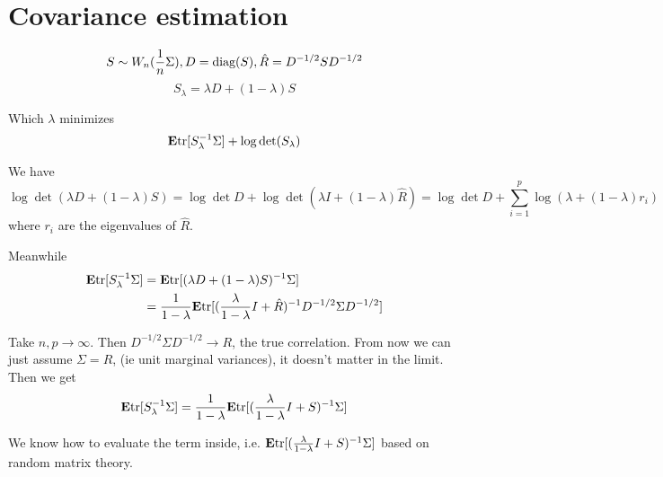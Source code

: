\documentclass[12pt]{article}
\begin{document}
\section{Covariance estimation}

\[
S \sim W_n(\frac{1}{n}\Sigma), D = \text{diag}(S), \hat{R} = D^{-1/2}S D^{-1/2}
\]
\[
S_\lambda = \lambda D + (1-\lambda)S
\]

Which $\lambda$ minimizes
\[
\textbf{E} \text{tr}[S_\lambda^{-1} \Sigma] + \log\det(S_\lambda)
\]

We have
\[
\log\det(\lambda D + (1-\lambda)S) = \log\det D + \log\det(\lambda I + (1-\lambda)\hat{R}) = \log\det D + \sum_{i=1}^p \log (\lambda + (1-\lambda) r_i)
\]
where $r_i$ are the eigenvalues of $\hat{R}$.

Meanwhile
\begin{align*}
\textbf{E} \text{tr}[S_\lambda^{-1} \Sigma] &=
\textbf{E} \text{tr}[(\lambda D + (1-\lambda)S)^{-1}\Sigma]
\\&= 
\frac{1}{1-\lambda} \textbf{E} \text{tr}[(\frac{\lambda}{1-\lambda}I +\hat{R})^{-1}D^{-1/2}\Sigma D^{-1/2}]
\end{align*}

Take $n, p \to \infty$.  Then $D^{-1/2}\Sigma D^{-1/2} \to R$, the true correlation.  From now we can just assume $\Sigma=R$, (ie unit marginal variances), it doesn't matter in the limit.  Then we get
\[
\textbf{E} \text{tr}[S_\lambda^{-1} \Sigma] = \frac{1}{1-\lambda} \textbf{E} \text{tr}[(\frac{\lambda}{1-\lambda}I + S)^{-1} \Sigma]
\]

We know how to evaluate the term inside, i.e. $\textbf{E} \text{tr}[(\frac{\lambda}{1-\lambda}I + S)^{-1} \Sigma]$ based on random matrix theory.
\end{document}
